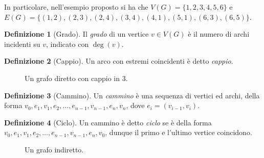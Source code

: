 \documentclass[14pt]{extreport}
\theoremstyle{definition}
\newtheorem{definition}{Definizione}[section]
\theoremstyle{remark}
\begin{document}
In particolare, nell'esempio proposto si ha che $V(G) = \{1, 2, 3, 4, 5, 6\}$ e $E(G) = \{(1, 2), (2, 3), (2, 4), (3, 4), (4, 1), (5, 1), (6, 3), (6, 5)\}$.

\begin{definition}[Grado]
    Il \textit{grado} di un vertice $v \in V(G)$ è il numero di archi incidenti su $v$, indicato con $\deg(v)$.
\end{definition}

\begin{definition}[Cappio]
    Un arco con estremi coincidenti è detto \textit{cappio}.
\end{definition}

\begin{figure}[h]
    \centering
    \caption{Un grafo diretto con cappio in 3.}
\end{figure}

\begin{definition}[Cammino]
    Un \textit{cammino} è una sequenza di vertici ed archi, della forma $v_0, e_1, v_1, e_2, \ldots , e_{n - 1}, v_{n - 1}, e_n, v_n$, dove $e_i=(v_{i - 1}, v_i)$.
\end{definition}

\begin{definition}[Ciclo]
    Un cammino è detto \textit{ciclo} se è della forma \\ $v_0, e_1, v_1, e_2, \ldots , e_{n - 1}, v_{n - 1}, e_n, v_0$, dunque il primo e l'ultimo vertice coincidono.
\end{definition}

\pagebreak

\begin{figure}[h]
    \centering
    \caption{Un grafo indiretto.}
\end{figure}
\end{document}
